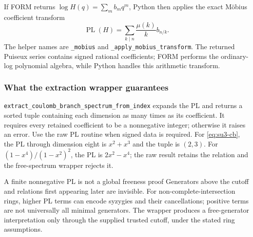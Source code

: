 \documentclass[11pt,a4paper]{article}
\numberwithin{equation}{section}
\newcommand{\code}[1]{{\small\nolinkurl{#1}}}
\newcommand{\PL}{\operatorname{PL}}
\begin{document}
If FORM returns $\log H(q)=\sum_m b_mq^m$, Python then applies the exact
M\"obius coefficient transform
\begin{equation}
 [q^n]\PL(H)=\sum_{k\mid n}\frac{\mu(k)}k b_{n/k}.
 \label{eq:mobius-coeff}
\end{equation}
The helper names are \code{_mobius} and \code{_apply_mobius_transform}.
The returned Puiseux series contains signed rational coefficients; FORM performs
the ordinary-log polynomial algebra, while Python handles this arithmetic transform.

\subsubsection{What the extraction wrapper guarantees}
\code{extract_coulomb_branch_spectrum_from_index} expands the PL and returns a
sorted tuple containing each dimension as many times as its coefficient. It
requires every retained coefficient to be a nonnegative integer; otherwise it
raises an error. Use the raw PL routine when signed data is required.
For \eqref{eq:su3-cb}, the PL through dimension eight is $x^2+x^3$ and the
tuple is $(2,3)$. For $(1-x^4)/(1-x^2)^2$, the PL is $2x^2-x^4$; the raw
result retains the relation and the free-spectrum wrapper rejects it.

\begin{note}{A finite nonnegative PL is not a global freeness proof}
Generators above the cutoff and relations first appearing later are invisible.
For non-complete-intersection rings, higher PL terms can encode syzygies and
their cancellations; positive terms are not universally all minimal generators.
The wrapper produces a free-generator interpretation only through the supplied
trusted cutoff, under the stated ring assumptions.
\end{note}

\clearpage
\end{document}
